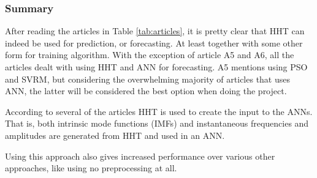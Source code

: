 \begin{description}
\end{description}




\subsubsection{Summary}
\label{sec:summary}

After reading the articles in Table \ref{tab:articles}, it is pretty clear that HHT can indeed be used for prediction, or forecasting. At least together with some other form for training algorithm. With the exception of article A5 and A6, all the articles dealt with using HHT and ANN for forecasting. A5 mentions using PSO and SVRM, but considering the overwhelming majority of articles that uses ANN, the latter will be considered the best option when doing the project. 

According to several of the articles HHT is used to create the input to the ANNs. That is, both intrinsic mode functions (IMFs) and instantaneous frequencies and amplitudes are generated from HHT and used in an ANN. 

Using this approach also gives increased performance over various other approaches, like using no preprocessing at all.


%
%


%



